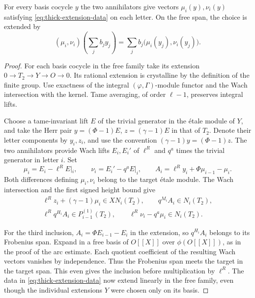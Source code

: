 \begin{lemma}
For every basis cocycle \(y\) the two annihilators give vectors \(\mu_i(y),\nu_i(y)\) satisfying \eqref{eq:thick-extension-data} on each letter. On the free span, the choice is extended by
\[
 (\mu_i,\nu_i)\!\left(\sum_j b_j y_j\right)=\sum_j b_j\big(\mu_i(y_j),\nu_i(y_j)\big).
\]
\end{lemma}
\begin{proof}
For each basis cocycle in the free family take its extension
\(0\to T_2\to Y\to O\to0\). Its rational extension is crystalline
by the definition of the finite group. Use exactness of the
integral \((\varphi,\Gamma)\)-module functor and the Wach
intersection with the kernel. Tame averaging, of order
\(\ell-1\), preserves integral lifts.

Choose a tame-invariant
lift \(E\) of the trivial generator in the \'etale module of
\(Y\), and take the Herr pair \(y=(\Phi-1)E\),
\(z=(\gamma-1)E\) in that of \(T_2\). Denote their letter
components by \(y_i,z_i\), and use the convention
\((\gamma-1)y=(\Phi-1)z\).
The two annihilators provide Wach lifts \(E_i,E_i'\) of
\(\ell^R\) and \(q^a\) times the trivial generator in letter \(i\).
Set
\[
 \mu_i=E_i-\ell^RE|_i,\qquad \nu_i=E_i'-q^a E|_i,\qquad
 A_i=\ell^R y_i+\Phi\mu_{i-1}-\mu_i .
\]
Both differences defining \(\mu_i,\nu_i\) belong to the target
\'etale module. The Wach intersection and the first signed height
bound give
\begin{equation}\label{eq:thick-extension-data}
\begin{gathered}
 \ell^R z_i+(\gamma-1)\mu_i\in XN_i(T_2),\qquad
 q^{M_i} A_i\in N_i(T_2),\\
 \ell^R q^{H_i} A_i\in P_{i-1}^{(1)}(T_2),\qquad
 \ell^R\nu_i-q^a\mu_i\in N_i(T_2).
\end{gathered}
\end{equation}

For the third inclusion, \(A_i=\Phi E_{i-1}-E_i\) in the
extension, so \(q^{H_i}A_i\) belongs to its Frobenius span.
Expand in a free basis of \(O[[X]]\) over \(\phi(O[[X]])\),
as in the proof of the arc estimate. Each quotient coefficient
of the resulting Wach vectors vanishes by independence.
Thus the Frobenius span meets the target in the target span.
This even gives the inclusion before multiplication by \(\ell^R\).
The data in \eqref{eq:thick-extension-data} now extend linearly in the free family,
even though the individual extensions \(Y\) were chosen only
on its basis.

\end{proof}
